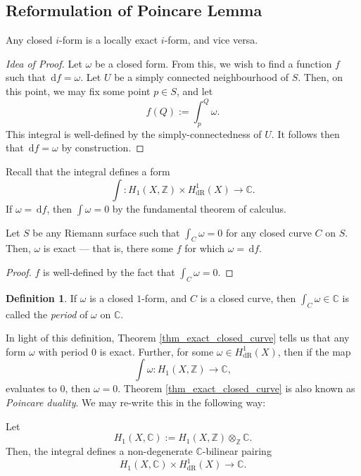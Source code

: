 \documentclass[a4paper]{report}
\theoremstyle{definition}
\newtheorem{definition}{Definition}
\theoremstyle{remark}
\theoremstyle{proposition}
\theoremstyle{conjecture}
\theoremstyle{lemma}
\theoremstyle{corollary}
\theoremstyle{exercise}
\theoremstyle{example}
\newcommand{\C}{\mathbb{C}}
\newcommand{\diff}{\,\mathrm{d}}
\newcommand{\on}{\operatorname}
\begin{document}
\subsection{Reformulation of Poincare Lemma}

\begin{theorem}
    Any closed $i$-form is a locally exact $i$-form, and vice versa.
\end{theorem}

\begin{proof}[Idea of Proof]
    Let $\omega$ be a closed form. From this, we wish to find a 
    function $f$ such that $\diff f = \omega$. 
    Let $U$ be a simply connected neighbourhood of $S$. Then, on this point, we 
    may fix some point $p \in S$, and let $$f(Q) := \int_p^Q \omega.$$
    This integral is well-defined by the simply-connectedness of $U$.
    It follows then that $\diff f = \omega$ by construction.
\end{proof}

Recall that the integral defines a form 
$$\int : H_1(X,\mathbb{Z}) \times H_{\on{dR}}^1(X) \longrightarrow \C.$$
If $\omega = \diff f$, then $\int \omega = 0$ by the fundamental
theorem of calculus.
\begin{theorem}\label{thm_exact_closed_curve}
    Let $S$ be any Riemann surface such that $\int_C \omega = 0$ for any 
    closed curve $C$ on $S$. Then, $\omega$ is exact --- that is, there 
    some $f$ for which $\omega = \diff f$.
\end{theorem}

\begin{proof}
    $f$ is well-defined by the fact that $\int_C \omega = 0$.
\end{proof}

\begin{definition}
    If $\omega$ is a closed $1$-form, and $C$ is a closed curve, then 
    $\int_C \omega \in \C$ is called the \emph{period} of $\omega$ on 
    $\C$.
\end{definition}

In light of this definition, Theorem \ref{thm_exact_closed_curve} 
tells us that any form $\omega$ with period $0$ is exact.
Further, for some $\omega \in H^1_{\on{dR}}(X)$, then if the map 
$$\int\omega : H_1(X,\mathbb{Z}) \longrightarrow \C,$$
evaluates to $0$, then $\omega = 0$.
Theorem \ref{thm_exact_closed_curve} is also known as \emph{Poincare duality}.
We may re-write this in the following way:

\begin{theorem}
    Let $$H_1(X,\C) := H_1(X,\mathbb{Z})\otimes_{\mathbb{Z}} \C.$$
    Then, the integral defines a non-degenerate $\C$-bilinear pairing
    $$H_1(X,\C) \times H^1_{\on{dR}}(X) \longrightarrow \C.$$
\end{theorem}
\end{document}
